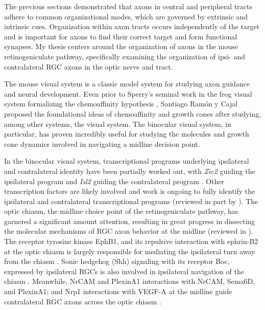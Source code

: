 The previous sections demonstrated that axons in central and peripheral tracts adhere to common organizational modes, which are governed by extrinsic and intrinsic cues.
Organization within axon tracts occurs independently of the target and is important for axons to find their correct target and form functional synapses.
My thesis centers around the organization of axons in the mouse retinogeniculate pathway, specifically examining the organization of ipsi- and contralateral RGC axons in the optic nerve and tract.

The mouse visual system is a classic model system for studying axon guidance and neural development.
Even prior to Sperry's seminal work in the frog visual system formalizing the chemoaffinity hypothesis \cite{sperry1963chemoaffinity}, Santiago Ram\'on y Cajal proposed the foundational ideas of chemoaffinity and growth cones after studying, among other systems, the visual system.
The binocular visual system, in particular, has proven incredibly useful for studying the molecules and growth cone dynamics involved in navigating a midline decision point.

In the binocular visual system, transcriptional programs underlying ipsilateral and contralateral identity have been partially worked out, with \emph{Zic2} guiding the ipsilateral program and \emph{Isl2} guiding the contralateral program \cite{herrera2003zic2,pak2004magnitude,garcia2008zic2}.
Other transcription factors are likely involved and work is ongoing to fully identify the ipsilateral and contralateral transcriptional programs (reviewed in part by ).
The optic chiasm, the midline choice point of the retinogeniculate pathway, has garnered a significant amount attention, resulting in great progress in dissecting the molecular mechanisms of RGC axon behavior at the midline (reviewed in ).
The receptor tyrosine kinase EphB1, and its repulsive interaction with ephrin-B2 at the optic chiasm is largely responsible for mediating the ipsilateral turn away from the chiasm \cite{nakagawa2000ephrin,williams2003ephrin,petros2009specificity}.
Sonic hedgehog (Shh) signaling with its receptor Boc, expressed by ipsilateral RGCs is also involved in ipsilateral navigation of the chiasm \cite{fabre2010segregation}.
Meanwhile, NrCAM and PlexinA1 interactions with NrCAM, Sema6D, and PlexinA1; and Nrp1 interactions with VEGF-A at the midline guide contralateral RGC axons across the optic chiasm \cite{williams2006role,erskine2011vegf,kuwajima2012optic}.

